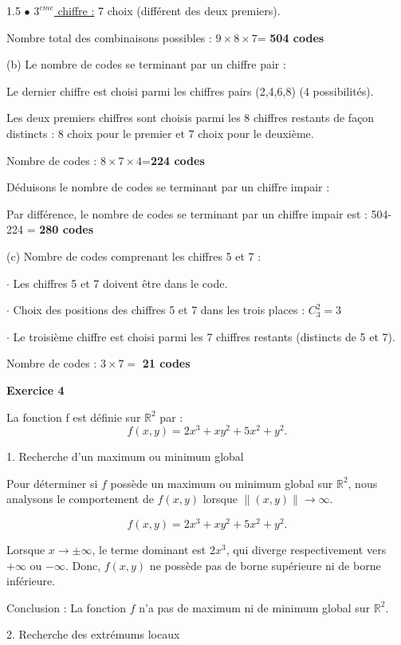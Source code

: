 \documentclass[12pt]{article}
\begin{document}
\begin{spacing}{1.5}
$\bullet$ \underline{$3^{eme}$ chiffre :} 7 choix (différent des deux premiers).

Nombre total des combinaisons possibles : $9\times 8\times 7$= \textbf{504 codes}

(b) Le nombre de codes se terminant par un chiffre pair :

Le dernier chiffre est choisi parmi les chiffres pairs (2,4,6,8) (4 possibilités).

Les deux premiers chiffres sont choisis parmi les 8 chiffres restants de façon distincts : 8 choix pour le premier et 7 choix pour le deuxième.

Nombre de codes : $8\times 7\times 4$=\textbf{224 codes}

\quad

Déduisons le nombre de codes se terminant par un chiffre impair :


Par différence, le nombre de codes se terminant par un chiffre impair est : 504-224 = \textbf{280 codes}


(c) Nombre de codes comprenant les chiffres 5 et 7 :

$\cdot$ Les chiffres 5 et 7 doivent être dans le code.

$\cdot$ Choix des positions des chiffres 5 et 7 dans les trois places : $C_3^2=3$

$\cdot$ Le troisième chiffre est choisi parmi les 7 chiffres restants (distincts de 5 et 7).

Nombre de codes : $3\times 7=$\textbf{ 21 codes}


\quad

\textbf{Exercice 4}

La fonction f est définie sur $\mathbb{R}^2$ par :
\[
f(x, y) = 2x^3 + xy^2 + 5x^2 + y^2.
\]

1. Recherche d'un maximum ou minimum global

Pour déterminer si $f$ possède un maximum ou minimum global sur $\mathbb{R}^2$, nous analysons le comportement de $f(x, y)$ lorsque $\|(x, y)\| \to \infty$.

\[
f(x, y) = 2x^3 + xy^2 + 5x^2 + y^2.
\]

Lorsque $x \to \pm \infty$, le terme dominant est $2x^3$, qui diverge respectivement vers $+\infty$ ou $-\infty$. Donc, $f(x, y)$ ne possède pas de borne supérieure ni de borne inférieure. 

Conclusion : La fonction $f$ n'a pas de maximum ni de minimum global sur $\mathbb{R}^2$.

2. Recherche des extrémums locaux


\end{spacing}
\end{document}

